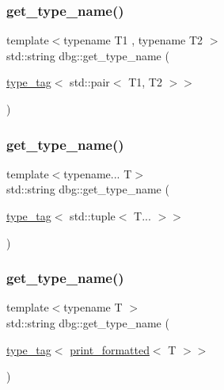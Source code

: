 \mbox{\label{namespacedbg_aa4daf4ad755b0a3b4206debc162f064d}} 
\subsubsection{\texorpdfstring{get\+\_\+type\+\_\+name()}{get\_type\_name()}\hspace{0.1cm}{\footnotesize\ttfamily [8/10]}}
{\footnotesize\ttfamily template$<$typename T1 , typename T2 $>$ \\
std\+::string dbg\+::get\+\_\+type\+\_\+name (\begin{DoxyParamCaption}\item[{\hyperlink{structdbg_1_1type__tag}{type\+\_\+tag}$<$ std\+::pair$<$ T1, T2 $>$$>$}]{ }\end{DoxyParamCaption})}

\mbox{\label{namespacedbg_a1d187f8063d8c8c024e57a7985bcac78}} 
\subsubsection{\texorpdfstring{get\+\_\+type\+\_\+name()}{get\_type\_name()}\hspace{0.1cm}{\footnotesize\ttfamily [9/10]}}
{\footnotesize\ttfamily template$<$typename... T$>$ \\
std\+::string dbg\+::get\+\_\+type\+\_\+name (\begin{DoxyParamCaption}\item[{\hyperlink{structdbg_1_1type__tag}{type\+\_\+tag}$<$ std\+::tuple$<$ T... $>$$>$}]{ }\end{DoxyParamCaption})}

\mbox{\label{namespacedbg_a6224c816a1c695160e869f427854d569}} 
\subsubsection{\texorpdfstring{get\+\_\+type\+\_\+name()}{get\_type\_name()}\hspace{0.1cm}{\footnotesize\ttfamily [10/10]}}
{\footnotesize\ttfamily template$<$typename T $>$ \\
std\+::string dbg\+::get\+\_\+type\+\_\+name (\begin{DoxyParamCaption}\item[{\hyperlink{structdbg_1_1type__tag}{type\+\_\+tag}$<$ \hyperlink{structdbg_1_1print__formatted}{print\+\_\+formatted}$<$ T $>$$>$}]{ }\end{DoxyParamCaption})\hspace{0.3cm}{\ttfamily [inline]}}

